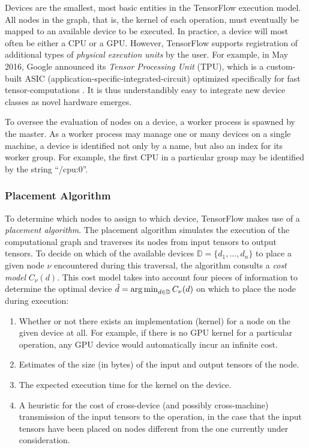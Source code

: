 Devices are the smallest, most basic entities in the TensorFlow execution
model. All nodes in the graph, that is, the kernel of each operation, must
eventually be mapped to an available device to be executed. In practice, a
device will most often be either a CPU or a GPU. However, TensorFlow supports
registration of additional types of \emph{physical execution units} by the
user. For example, in May 2016, Google announced its \emph{Tensor Processing
  Unit} (TPU), which is a custom-built ASIC
(application-specific-integrated-circuit) optimized specifically for fast
tensor-computations \cite{tpu}. It is thus understandibly easy to integrate new
device classes as novel hardware emerges.

To oversee the evaluation of nodes on a device, a worker process is spawned by
the master. As a worker process may manage one or many devices on a single
machine, a device is identified not only by a name, but also an index for its
worker group. For example, the first CPU in a particular group may be identified
by the string ``/cpu:0''.

\subsubsection{Placement Algorithm}\label{sec:model-exec-placement}

To determine which nodes to assign to which device, TensorFlow makes use of a
\emph{placement algorithm}. The placement algorithm simulates the execution of
the computational graph and traverses its nodes from input tensors to output
tensors. To decide on which of the available devices
$\mathbb{D} = \{d_1, \dots, d_n\}$ to place a given node $\nu$ encountered
during this traversal, the algorithm consults a \emph{cost model}
$C_\nu(d)$. This cost model takes into account four pieces of information to
determine the optimal device $\hat{d} = \operatorname*{arg\,min}_{d \in \mathbb{D}} C_\nu(d)$ on
which to place the node during execution:

\begin{enumerate}
  \item Whether or not there exists an implementation (kernel) for a node on the
    given device at all. For example, if there is no GPU kernel for a particular
    operation, any GPU device would automatically incur an infinite cost.
  \item Estimates of the size (in bytes) of the input and output tensors of the
    node.
  \item The expected execution time for the kernel on the device.
  \item A heuristic for the cost of cross-device (and possibly cross-machine)
    transmission of the input tensors to the operation, in the case that the
    input tensors have been placed on nodes different from the one currently
    under consideration.
\end{enumerate}

